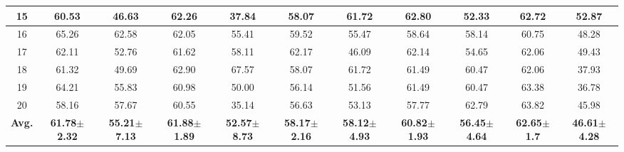 \begin{table}[h!]
{\begin{tabular}{|*{11}{c|}}
			15 & 60.53 & 46.63 & 62.26 & 37.84 & 58.07 & 61.72 & 62.80 & 52.33 & 62.72 & 52.87 \\\hline
			16 & \cellcolor{orange}65.26 & \cellcolor{orange}62.58 & 62.05 & 55.41 & 59.52 & 55.47 & 58.64 & 58.14 & 60.75 & 48.28 \\\hline
			17 & 62.11 & 52.76 & 61.62 & 58.11 & 62.17 & 46.09 & 62.14 & 54.65 & 62.06 & 49.43 \\\hline
			18 & 61.32 & 49.69 & 62.90 & 67.57 & 58.07 & 61.72 & 61.49 & 60.47 & 62.06 & 37.93 \\\hline
			19 & 64.21 & 55.83 & 60.98 & 50.00 & 56.14 & 51.56 & 61.49 & 60.47 & 63.38 & 36.78 \\\hline
			20 & 58.16 & 57.67 & 60.55 & 35.14 & 56.63 & 53.13 & 57.77 & 62.79 & 63.82 & 45.98 \\\hline
			\textbf{Avg.} & \textbf{61.78}\boldmath$\pm$\textbf{2.32} & \textbf{55.21}\boldmath$\pm$\textbf{7.13} & \textbf{61.88}\boldmath$\pm$\textbf{1.89} & \textbf{52.57}\boldmath$\pm$\textbf{8.73} & \textbf{58.17}\boldmath$\pm$\textbf{2.16} & \textbf{58.12}\boldmath$\pm$\textbf{4.93} & \textbf{60.82}\boldmath$\pm$\textbf{1.93} & \textbf{56.45}\boldmath$\pm$\textbf{4.64} & \textbf{62.65}\boldmath$\pm$\textbf{1.7} & \textbf{46.61}\boldmath$\pm$\textbf{4.28} \\\hline
		\end{tabular}%
	}
	\label{Table: NeuCube_Imagined_Accuracies1}%
\end{table}%

